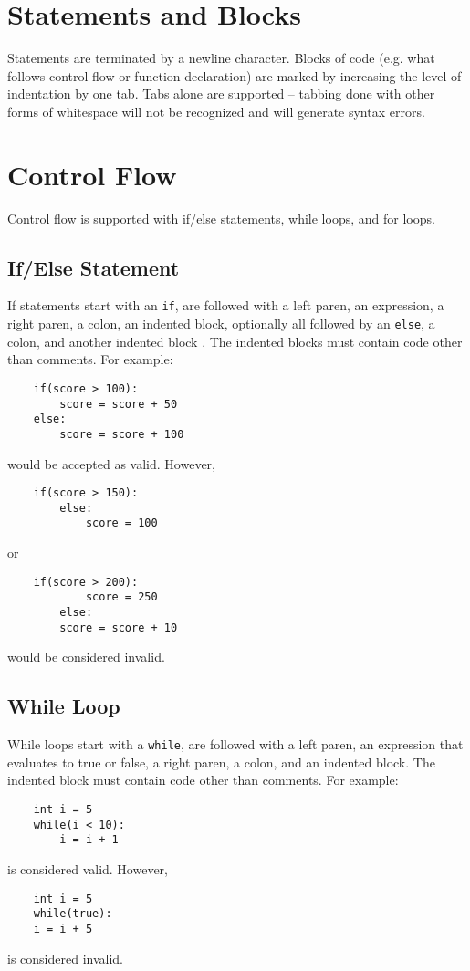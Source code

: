 \documentclass[titlepage]{article}
\begin{document}
\section{Statements and Blocks}
Statements are terminated by a newline character. Blocks of code (e.g. what follows control flow or function declaration) are marked by increasing the level of indentation by one tab. Tabs alone are supported -- tabbing done with other forms of whitespace will not be recognized and will generate syntax errors.

\section{Control Flow}
Control flow is supported with if/else statements, while loops, and for loops.

\subsection {If/Else Statement}
If statements start with an \verb|if|, are followed with a left paren, an expression, a right paren, a colon, an indented block, optionally all followed by an \verb|else|, a colon, and another indented block . The indented blocks must contain code other than comments. For example:
\begin{verbatim}
    if(score > 100):
        score = score + 50
    else:
        score = score + 100
\end{verbatim}
would be accepted as valid. However,
\begin{verbatim}
    if(score > 150):
        else:
            score = 100
\end{verbatim}
or
\begin{verbatim}
    if(score > 200):
            score = 250
        else:
        score = score + 10
\end{verbatim}
would be considered invalid.
\subsection{While Loop}
While loops start with a \verb|while|, are followed with a left paren, an expression that evaluates to true or false, a right paren, a colon, and an indented block. The indented block must contain code other than comments. For example:
\begin{verbatim}
    int i = 5
    while(i < 10):
        i = i + 1
\end{verbatim}
is considered valid. However,
\begin{verbatim}
    int i = 5
    while(true):
    i = i + 5
\end{verbatim}
is considered invalid. 
\end{document}
